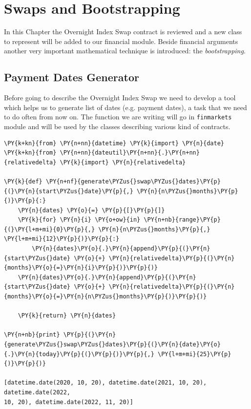 \chapter{Swaps and Bootstrapping}\label{sec:swaps-and-bootstrapping}

In this Chapter the Overnight Index Swap contract is reviewed and a new class to represent 
will be added to our financial module. Beside financial arguments another very important mathematical technique is introduced: the \emph{bootstrapping}.

\section{Payment Dates Generator}
Before going to describe the Overnight Index Swap we need to develop a tool which helps us to generate list of dates (e.g. payment dates), a task that we need to do often from now on. 
The function we are writing will go in \texttt{finmarkets} module and will be used by the classes describing various kind of contracts.

\begin{codebox}[size=fbox, boxrule=1pt, colback=cellbackground, colframe=cellborder]
\begin{Verbatim}[commandchars=\\\{\}]
\PY{k+kn}{from} \PY{n+nn}{datetime} \PY{k}{import} \PY{n}{date}
\PY{k+kn}{from} \PY{n+nn}{dateutil}\PY{n+nn}{.}\PY{n+nn}{relativedelta} \PY{k}{import} \PY{n}{relativedelta}

\PY{k}{def} \PY{n+nf}{generate\PYZus{}swap\PYZus{}dates}\PY{p}{(}\PY{n}{start\PYZus{}date}\PY{p}{,} \PY{n}{n\PYZus{}months}\PY{p}{)}\PY{p}{:}
    \PY{n}{dates} \PY{o}{=} \PY{p}{[}\PY{p}{]}
    \PY{k}{for} \PY{n}{i} \PY{o+ow}{in} \PY{n+nb}{range}\PY{p}{(}\PY{l+m+mi}{0}\PY{p}{,} \PY{n}{n\PYZus{}months}\PY{p}{,} \PY{l+m+mi}{12}\PY{p}{)}\PY{p}{:}
        \PY{n}{dates}\PY{o}{.}\PY{n}{append}\PY{p}{(}\PY{n}{start\PYZus{}date} \PY{o}{+} \PY{n}{relativedelta}\PY{p}{(}\PY{n}{months}\PY{o}{=}\PY{n}{i}\PY{p}{)}\PY{p}{)}
    \PY{n}{dates}\PY{o}{.}\PY{n}{append}\PY{p}{(}\PY{n}{start\PYZus{}date} \PY{o}{+} \PY{n}{relativedelta}\PY{p}{(}\PY{n}{months}\PY{o}{=}\PY{n}{n\PYZus{}months}\PY{p}{)}\PY{p}{)}
    
    \PY{k}{return} \PY{n}{dates}

\PY{n+nb}{print} \PY{p}{(}\PY{n}{generate\PYZus{}swap\PYZus{}dates}\PY{p}{(}\PY{n}{date}\PY{o}{.}\PY{n}{today}\PY{p}{(}\PY{p}{)}\PY{p}{,} \PY{l+m+mi}{25}\PY{p}{)}\PY{p}{)}

[datetime.date(2020, 10, 20), datetime.date(2021, 10, 20), datetime.date(2022,
10, 20), datetime.date(2022, 11, 20)]
    \end{Verbatim}
\end{codebox}

